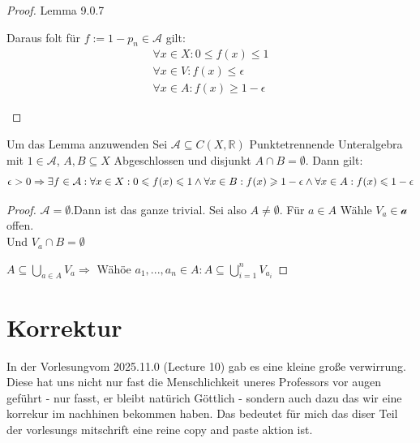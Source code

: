 \begin{proof}{Lemma 9.0.7}
\begin{enumerate}
\begin{itemize}
        Daraus folt für $f := 1-p_n \in \mathcal{A}$ gilt:
        \begin{equation*}
            \begin{split}
                \forall x \in X : 0 \leq f(x) \leq 1\\
                \forall x \in V : f(x) \leq \epsilon\\
                \forall x \in A : f(x) \geq 1-\epsilon
            \end{split}
        \end{equation*}
    \end{itemize}
    \end{enumerate}
\end{proof}

\begin{corollary}{Um das Lemma anzuwenden}
Sei $\mathcal{A} \subseteq C(X,\mathbb{R})$ Punktetrennende Unteralgebra mit $1 \in \mathcal{A}$, 
$A,B \subseteq X$ Abgeschlossen und disjunkt $A \cap B = \emptyset$. Dann gilt:
$$
\epsilon > 0 \Rightarrow \exists f \in \mathcal{A} :
\forall x \in X : 0 \leqslant f(x) \leqslant 1 \wedge \forall x \in B:
f(x) \geqslant 1-\epsilon \wedge \forall x \in A : f(x) \leqslant 1 -\epsilon 
$$
\end{corollary}

\begin{proof}
    $\mathcal{A}= \emptyset$.Dann ist das ganze trivial.
    Sei also $A \neq \emptyset$. Für $a \in A$ Wähle $V_a \in \mathcal{a}$ offen.\\
    Und $V_a \cap B = \emptyset$

    $A \subseteq \bigcup_{a \in A}V_a\Rightarrow$ Wähöe $a_1,...,a_n \in A:
    A \subseteq \bigcup_{i=1}^{n}V_{a_i}$
\end{proof}

\section{Korrektur}

In der Vorlesungvom 2025.11.0 (Lecture 10) gab es eine kleine große verwirrung.
Diese hat uns nicht nur fast die Menschlichkeit uneres Professors vor augen geführt - nur fasst, 
er bleibt natürich Göttlich - sondern auch dazu das wir eine korrekur im nachhinen bekommen haben. 
Das bedeutet für mich das diser Teil der vorlesungs mitschrift eine reine copy and paste aktion ist.



